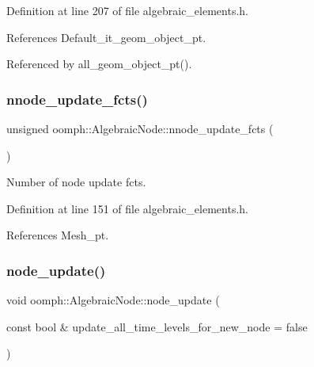 Definition at line 207 of file algebraic\+\_\+elements.\+h.



References Default\+\_\+it\+\_\+geom\+\_\+object\+\_\+pt.



Referenced by all\+\_\+geom\+\_\+object\+\_\+pt().

\mbox{\label{classoomph_1_1AlgebraicNode_a8c9e49f378f2dc9e93e62e281bf58d27}} 
\subsubsection{\texorpdfstring{nnode\+\_\+update\+\_\+fcts()}{nnode\_update\_fcts()}}
{\footnotesize\ttfamily unsigned oomph\+::\+Algebraic\+Node\+::nnode\+\_\+update\+\_\+fcts (\begin{DoxyParamCaption}{ }\end{DoxyParamCaption})\hspace{0.3cm}{\ttfamily [inline]}}



Number of node update fcts. 



Definition at line 151 of file algebraic\+\_\+elements.\+h.



References Mesh\+\_\+pt.

\mbox{\label{classoomph_1_1AlgebraicNode_a754dc8fcac3382a07f60262c9792c84c}} 
\subsubsection{\texorpdfstring{node\+\_\+update()}{node\_update()}}
{\footnotesize\ttfamily void oomph\+::\+Algebraic\+Node\+::node\+\_\+update (\begin{DoxyParamCaption}\item[{const bool \&}]{update\+\_\+all\+\_\+time\+\_\+levels\+\_\+for\+\_\+new\+\_\+node = {\ttfamily false} }\end{DoxyParamCaption})\hspace{0.3cm}{\ttfamily [virtual]}}



